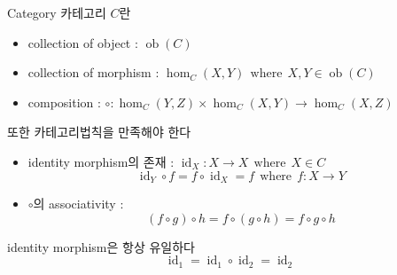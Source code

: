 \documentclass[t]{beamer}
\newcommand\where[0]{\ \ \text{where} \ \ }
\newcommand\cthom[3]{\operatorname{hom}_{#1}(#2,#3)}
\newcommand\ctid[1]{\operatorname{id}_{#1}}
\begin{document}

\begin{frame}{Category}
  카테고리 \(C\)란
  \begin{itemize}
    \item collection of object : \(\operatorname{ob}(C)\)
    \item collection of morphism : \( \cthom{C}{X}{Y} \where X, Y \in \operatorname{ob}(C) \)
    \item composition : \( \circ : \cthom{C}{Y}{Z} \times \cthom{C}{X}{Y} \to \cthom{C}{X}{Z} \)
  \end{itemize}
  \pause
  또한 카테고리법칙을 만족해야 한다
  \begin{itemize}
    \item identity morphism의 존재 : \( \ctid{X} : X \to X \where X \in C \)
      \[ \ctid{Y} \circ f = f \circ \ctid{X} = f \where f : X \to Y \]
    \item \(\circ\)의 associativity :
      \[ (f \circ g) \circ h = f \circ (g \circ h) = f \circ g \circ h \]
  \end{itemize}
  \pause
  identity morphism은 항상 유일하다
  \[ \ctid{1} = \ctid{1} \circ \ctid{2} = \ctid{2} \]
\end{frame}
\end{document}
